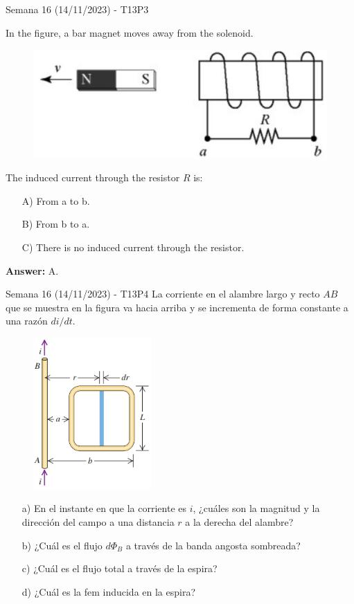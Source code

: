 \begin{frame}{Semana 16 (14/11/2023) - T13P3}
    
    In the figure, a bar magnet moves away from the solenoid.
    
    \begin{figure}
        \centering
        \includegraphics[scale=0.35]{figures/t11p3.png}
    \end{figure}
    
    The induced current through the resistor $R$ is:
    
    \begin{itemize}
        \item[A)] From a to b.
        \item[B)] From b to a.
        \item[C)] There is no induced current through the resistor.
    \end{itemize}
    
    \pause \centering \textbf{Answer:} A.
    
    
\end{frame}

\begin{frame}{Semana 16 (14/11/2023) - T13P4}
    La corriente en el
alambre largo y recto $AB$ que se
muestra en la figura va hacia arriba y se incrementa de forma
constante a una razón $di/dt$.

\begin{figure}
        \centering
        \includegraphics[height=0.3\textwidth,width=0.4\textwidth]{figures/t15p1.png}
    \end{figure}

\begin{itemize}
    \item[a)] En
el instante en que la corriente es $i$,
¿cuáles son la magnitud y la dirección del campo a una distancia $r$
a la derecha del alambre?
    \item[b)] ¿Cuál
es el flujo $d\Phi_B$ a través de la banda
angosta sombreada?
    \item[c)] ¿Cuál es el
flujo total a través de la espira?
\item[d)] ¿Cuál es la fem inducida en la
espira?
\end{itemize}
\end{frame}

